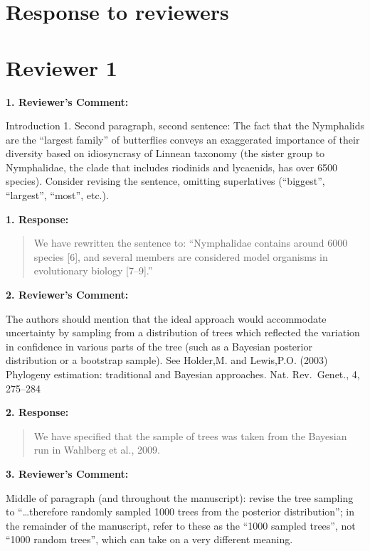 \documentclass[]{article}
\date{}
\begin{document}
\section{Response to reviewers}\label{response-to-reviewers}

\section{Reviewer 1}\label{reviewer-1}

\textbf{1. Reviewer's Comment:}

Introduction 1. Second paragraph, second sentence: The fact that the
Nymphalids are the ``largest family'' of butterflies conveys an
exaggerated importance of their diversity based on idiosyncrasy of
Linnean taxonomy (the sister group to Nymphalidae, the clade that
includes riodinids and lycaenids, has over 6500 species). Consider
revising the sentence, omitting superlatives (``biggest'', ``largest'',
``most'', etc.).

\textbf{1. Response:}

\begin{quote}
\color{blue}
We have rewritten the sentence to: ``Nymphalidae contains around 6000
species {[}6{]}, and several members are considered model organisms in
evolutionary biology {[}7--9{]}.''
\end{quote}

\textbf{2. Reviewer's Comment:}

The authors should mention that the ideal approach would accommodate
uncertainty by sampling from a distribution of trees which reflected the
variation in confidence in various parts of the tree (such as a Bayesian
posterior distribution or a bootstrap sample). See Holder,M. and
Lewis,P.O. (2003) Phylogeny estimation: traditional and Bayesian
approaches. Nat. Rev.~Genet., 4, 275--284

\textbf{2. Response:}

\begin{quote}
\color{blue}
We have specified that the sample of trees was taken from the Bayesian
run in Wahlberg et al., 2009.
\end{quote}

\textbf{3. Reviewer's Comment:}

Middle of paragraph (and throughout the manuscript): revise the tree
sampling to ``\ldots{}therefore randomly sampled 1000 trees from the
posterior distribution''; in the remainder of the manuscript, refer to
these as the ``1000 sampled trees'', not ``1000 random trees'', which
can take on a very different meaning.
\end{document}
